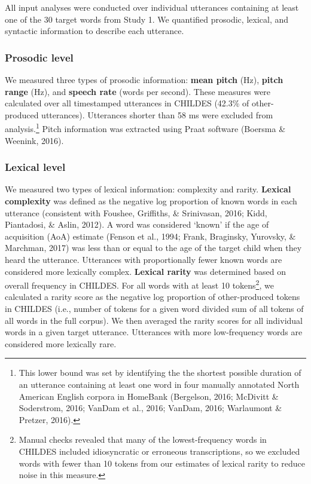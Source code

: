 \documentclass[10pt, letterpaper]{article}
\begin{document}
All input analyses were conducted over individual utterances containing
at least one of the 30 target words from Study 1. We quantified
prosodic, lexical, and syntactic information to describe each utterance.

\hypertarget{prosodic-level}{%
\subsubsection{Prosodic level}\label{prosodic-level}}

We measured three types of prosodic information: \textbf{mean pitch}
(Hz), \textbf{pitch range} (Hz), and \textbf{speech rate} (words per
second). These measures were calculated over all timestamped utterances
in CHILDES (42.3\% of other-produced utterances). Utterances shorter
than 58 ms were excluded from analysis.\footnote{This lower bound was
  set by identifying the the shortest possible duration of an utterance
  containing at least one word in four manually annotated North American
  English corpora in HomeBank (Bergelson, 2016; McDivitt \& Soderstrom,
  2016; VanDam et al., 2016; VanDam, 2016; Warlaumont \& Pretzer, 2016).}
Pitch information was extracted using Praat software (Boersma \&
Weenink, 2016).

\hypertarget{lexical-level}{%
\subsubsection{Lexical level}\label{lexical-level}}

We measured two types of lexical information: complexity and rarity.
\textbf{Lexical complexity} was defined as the negative log proportion
of known words in each utterance (consistent with Foushee, Griffiths, \&
Srinivasan, 2016; Kidd, Piantadosi, \& Aslin, 2012). A word was
considered `known' if the age of acquisition (AoA) estimate (Fenson et
al., 1994; Frank, Braginsky, Yurovsky, \& Marchman, 2017) was less than
or equal to the age of the target child when they heard the utterance.
Utterances with proportionally fewer known words are considered more
lexically complex. \textbf{Lexical rarity} was determined based on
overall frequency in CHILDES. For all words with at least 10
tokens\footnote{Manual checks revealed that many of the lowest-frequency
  words in CHILDES included idiosyncratic or erroneous transcriptions,
  so we excluded words with fewer than 10 tokens from our estimates of
  lexical rarity to reduce noise in this measure.}, we calculated a
rarity score as the negative log proportion of other-produced tokens in
CHILDES (i.e., number of tokens for a given word divided sum of all
tokens of all words in the full corpus). We then averaged the rarity
scores for all individual words in a given target utterance. Utterances
with more low-frequency words are considered more lexically rare.
\end{document}
